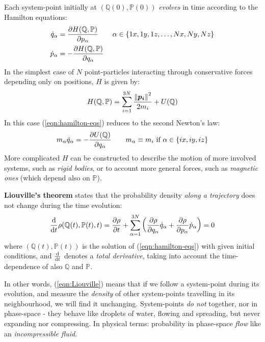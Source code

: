 \documentclass[../template.tex]{subfiles}
\begin{document}
Each system-point initially at $(\mathbb{Q}(0), \mathbb{P}(0))$ \textit{evolves} in time according to the Hamilton equations:
\begin{align}\label{eqn:hamilton-eqs}
    \dot{q}_\alpha &= \pdv{H(\mathbb{Q},\mathbb{P})}{p_\alpha}\qquad \alpha \in \{1x, 1y, 1z,\dots, Nx, Ny, Nz\}\\
    \dot{p}_{\alpha} &= -\pdv{H(\mathbb{Q},\mathbb{P})}{q_\alpha}
\end{align} 
In the simplest case of $N$ point-particles interacting through conservative forces depending only on positions, $H$ is given by:
\begin{align*}
    H(\mathbb{Q},\mathbb{P}) = \sum_{i=1}^{3N} \frac{\norm{\bm{p_i}}^2}{2m_i} + U(\mathbb{Q}) 
\end{align*}
In this case (\ref{eqn:hamilton-eqs}) reduces to the second Newton's law:
\begin{align}\label{eqn:newton-eqs}
    m_\alpha \ddot{q}_\alpha = - \pdv{U(\mathbb{Q})}{q_\alpha} \qquad m_\alpha \equiv m_i \text{ if } \alpha \in \{ix,iy,iz\}
\end{align}
More complicated $H$ can be constructed to describe the motion of more involved systems, such as \textit{rigid bodies}, or to account more general forces, such as \textit{magnetic ones} (which depend also on $\mathbb{P}$).

\medskip

\textbf{Liouville's theorem} states that the probability density \textit{along a trajectory} does not change during the time evolution: 
\begin{align}\label{eqn:Liouville}
    \dv{t} \rho(\mathbb{Q}(t), \mathbb{P}(t),t) = \pdv{\rho}{t} + \sum_{\alpha=1}^{3N} \left(\pdv{\rho}{q_\alpha} \dot{q}_\alpha + \pdv{\rho}{p_\alpha} \dot{p}_\alpha\right) = 0
\end{align}
where $(\mathbb{Q}(t), \mathbb{P}(t))$ is the solution of (\ref{eqn:hamilton-eqs}) with given initial conditions, and $\dv{t}$ denotes a \textit{total derivative}, taking into account the time-dependence of also $\mathbb{Q}$ and $\mathbb{P}$.  

\medskip

In other words, (\ref{eqn:Liouville}) means that if we follow a system-point during its evolution, and measure the \textit{density} of other system-points travelling in its neighbourhood, we will find it unchanging. System-points \textit{do not}  together, nor  in phase-space - they behave like droplets of water, flowing and spreading, but never expanding nor compressing. In physical terms: probability in phase-space \textit{flow} like an \textit{incompressible fluid}.   
\end{document}
